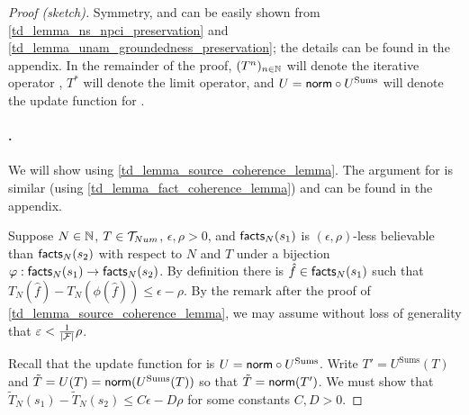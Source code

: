 \begin{proof}[Proof (sketch)]

    Symmetry, \unanimity{} and \groundedness{} can be easily shown from
\cref{td_lemma_ns_npci_preservation} and
\cref{td_lemma_unam_groundedness_preservation}; the details can be found in the
appendix.
%
In the remainder of the proof, $(T^n)_{n \in \mathbb{N}}$ will denote the iterative
operator \sums{}, $T^*$ will denote the limit operator, and $U = \mathsf{norm} \circ
U^{\text{Sums}}$ will denote the update function for \sums{}.

    \paragraph{\coherence{}.} We will show \sourcecoherence{} using
    \cref{td_lemma_source_coherence_lemma}. The argument for \factcoherence{} is similar
(using \cref{td_lemma_fact_coherence_lemma}) and can be found in the appendix.

Suppose $N \in \mathbb{N}$, $T \in \mathcal{T}_{Num}$, $\epsilon, \rho > 0$, and $\mathsf{facts}_N(s_1)$ is
$(\epsilon, \rho)$-less believable than $\mathsf{facts}_N(s_2)$ with respect to $N$ and
$T$ under a bijection $\varphi: \mathsf{facts}_N(s_1) \to \mathsf{facts}_N(s_2)$. By definition
there is $\hat{f} \in \mathsf{facts}_N(s_1)$ such that $T_N(\hat{f}) -
T_N(\phi(\hat{f})) \le \epsilon - \rho$. By the remark after the proof of
\cref{td_lemma_source_coherence_lemma}, we may assume without loss of generality
that $\varepsilon < \frac{1}{|\mathcal{F}|} \rho$.

Recall that the update function for \sums{} is $U = \mathsf{norm} \circ
U^{\text{Sums}}$. Write $T' = U^{\text{Sums}}(T)$ and $\tilde{T} = U(T)
= \mathsf{norm}(U^{\text{Sums}}(T))$ so that $\tilde{T} = \mathsf{norm}(T')$. We must show that
$\tilde{T}_N(s_1) - \tilde{T}_N(s_2) \le C\epsilon - D\rho$ for some constants
$C, D > 0$.


\end{proof}
